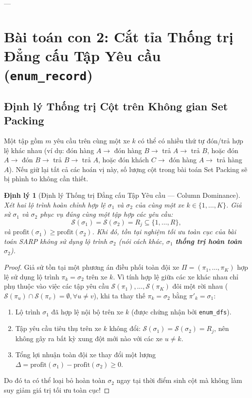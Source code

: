 \documentclass[11pt,a4paper]{article}
\newtheorem{theorem}{Định lý}[section]
\theoremstyle{definition}
\begin{document}
---

\section{Bài toán con 2: Cắt tỉa Thống trị Đẳng cấu Tập Yêu cầu (\texttt{enum\_record})}

\subsection{Định lý Thống trị Cột trên Không gian Set Packing}
Một tập gồm $m$ yêu cầu trên cùng một xe $k$ có thể có nhiều thứ tự đón/trả hợp lệ khác nhau (ví dụ: đón hàng $A \to$ đón hàng $B \to$ trả $A \to$ trả $B$, hoặc đón $A \to$ đón $B \to$ trả $B \to$ trả $A$, hoặc đón khách $C \to$ đón hàng $A \to$ trả hàng $A$). Nếu giữ lại tất cả các hoán vị này, số lượng cột trong bài toán Set Packing sẽ bị phình to không cần thiết.

\begin{theorem}[Định lý Thống trị Đẳng cấu Tập Yêu cầu --- Column Dominance]
Xét hai lộ trình hoàn chỉnh hợp lệ $\sigma_1$ và $\sigma_2$ của cùng một xe $k \in \{1, \dots, K\}$. Giả sử $\sigma_1$ và $\sigma_2$ phục vụ đúng cùng một tập hợp các yêu cầu:
\[
    \mathcal{S}(\sigma_1) = \mathcal{S}(\sigma_2) = R_j \subseteq \{1, \dots, R\},
\]
và $\text{profit}(\sigma_1) \ge \text{profit}(\sigma_2)$. Khi đó, tồn tại nghiệm tối ưu toàn cục của bài toán SARP không sử dụng lộ trình $\sigma_2$ (nói cách khác, $\sigma_1$ \textbf{thống trị hoàn toàn} $\sigma_2$).
\end{theorem}
\begin{proof}
Giả sử tồn tại một phương án điều phối toàn đội xe $\Pi = (\pi_1, \dots, \pi_K)$ hợp lệ sử dụng lộ trình $\pi_k = \sigma_2$ trên xe $k$. Vì tính hợp lệ giữa các xe khác nhau chỉ phụ thuộc vào việc các tập yêu cầu $\mathcal{S}(\pi_1), \dots, \mathcal{S}(\pi_K)$ đôi một rời nhau ($\mathcal{S}(\pi_u) \cap \mathcal{S}(\pi_v) = \emptyset, \forall u \neq v$), khi ta thay thế $\pi_k = \sigma_2$ bằng $\pi'_k = \sigma_1$:
\begin{enumerate}[leftmargin=1.5em]
    \item Lộ trình $\sigma_1$ đã hợp lệ nội bộ trên xe $k$ (được chứng nhận bởi \texttt{enum\_dfs}).
    \item Tập yêu cầu tiêu thụ trên xe $k$ không đổi: $\mathcal{S}(\sigma_1) = \mathcal{S}(\sigma_2) = R_j$, nên không gây ra bất kỳ xung đột mới nào với các xe $u \neq k$.
    \item Tổng lợi nhuận toàn đội xe thay đổi một lượng $\Delta = \text{profit}(\sigma_1) - \text{profit}(\sigma_2) \ge 0$.
\end{enumerate}
Do đó ta có thể loại bỏ hoàn toàn $\sigma_2$ ngay tại thời điểm sinh cột mà không làm suy giảm giá trị tối ưu toàn cục!
\end{proof}
\end{document}
